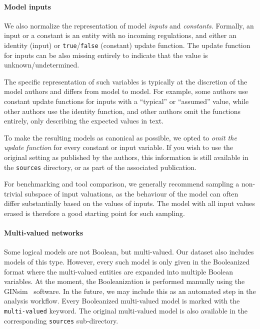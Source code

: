 \documentclass{article}
\begin{document}
\paragraph{Model inputs} We also normalize the representation of model \emph{inputs} and \emph{constants}. Formally, an input or a constant is an entity with no incoming regulations, and either an identity (input) or \texttt{true}/\texttt{false} (constant) update function. The update function for inputs can be also missing entirely to indicate that the value is unknown/undetermined.

The specific representation of such variables is typically at the discretion of the model authors and differs from model to model. For example, some authors use constant update functions for inputs with a ``typical'' or ``assumed'' value, while other authors use the identity function, and other authors omit the functions entirely, only describing the expected values in text.

To make the resulting models as canonical as possible, we opted to \emph{omit the update function} for every constant or input variable. If you wish to use the original setting as published by the authors, this information is still available in the \texttt{sources} directory, or as part of the associated publication.

For benchmarking and tool comparison, we generally recommend sampling a non-trivial subspace of input valuations, as the behaviour of the model can often differ substantially based on the values of inputs. The model with all input values erased is therefore a good starting point for such sampling.

\paragraph{Multi-valued networks} Some logical models are not Boolean, but multi-valued. Our dataset also includes models of this type. However, every such model is only given in the Booleanized format where the multi-valued entities are expanded into multiple Boolean variables. At the moment, the Booleanization is performed manually using the GINsim~\cite{ginsim} software. In the future, we may include this as an automated step in the analysis workflow. Every Booleanized multi-valued model is marked with the \texttt{multi-valued} keyword. The original multi-valued model is also available in the corresponding \texttt{sources} sub-directory.
\end{document}
